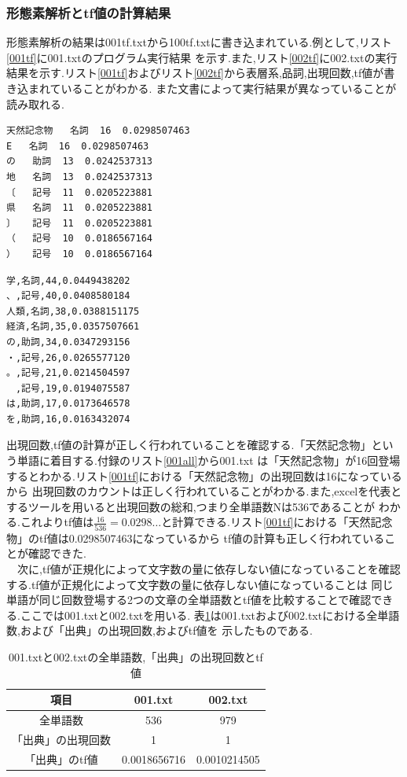 \documentclass[a4j]{jarticle}
\begin{document}
\subsubsection{形態素解析とtf値の計算結果}
形態素解析の結果は001tf.txtから100tf.txtに書き込まれている.例として,リスト\ref{001tf}に001.txtのプログラム実行結果
を示す.また,リスト\ref{002tf}に002.txtの実行結果を示す.リスト\ref{001tf}およびリスト\ref{002tf}から表層系,品詞,出現回数,tf値が書き込まれていることがわかる.
また文書によって実行結果が異なっていることが読み取れる.
\begin{lstlisting}[basicstyle=\ttfamily\footnotesize, frame=single,label=001tf,caption=001tf.txtの抜粋]
%	名詞	41	0.0764925373
天然記念物	名詞	16	0.0298507463
E	名詞	16	0.0298507463
の	助詞	13	0.0242537313
地	名詞	13	0.0242537313
〔	記号	11	0.0205223881
県	名詞	11	0.0205223881
〕	記号	11	0.0205223881
（	記号	10	0.0186567164
）	記号	10	0.0186567164
	\end{lstlisting}

\begin{lstlisting}[basicstyle=\ttfamily\footnotesize, frame=single,label=002tf,caption=002tf.txtの抜粋]
学,名詞,44,0.0449438202
、,記号,40,0.0408580184
人類,名詞,38,0.0388151175
経済,名詞,35,0.0357507661
の,助詞,34,0.0347293156
・,記号,26,0.0265577120
。,記号,21,0.0214504597
　,記号,19,0.0194075587
は,助詞,17,0.0173646578
を,助詞,16,0.0163432074
	\end{lstlisting}

出現回数,tf値の計算が正しく行われていることを確認する.「天然記念物」という単語に着目する.付録のリスト\ref{001all}から001.txt
は「天然記念物」が16回登場するとわかる.リスト\ref{001tf}における「天然記念物」の出現回数は16になっているから
出現回数のカウントは正しく行われていることがわかる.また,excelを代表とするツールを用いると出現回数の総和,つまり全単語数Nは536であることが
わかる.これよりtf値は$\frac{16}{536}=0.0298\dots$と計算できる.リスト\ref{001tf}における「天然記念物」のtf値は0.0298507463になっているから
tf値の計算も正しく行われていることが確認できた.\\
　次に,tf値が正規化によって文字数の量に依存しない値になっていることを確認する.tf値が正規化によって文字数の量に依存しない値になっていることは
同じ単語が同じ回数登場する2つの文章の全単語数とtf値を比較することで確認できる.ここでは001.txtと002.txtを用いる.
表\ref{tfh}は001.txtおよび002.txtにおける全単語数,および「出典」の出現回数,およびtf値を
示したものである.
\begin{table}[H]
	\caption{001.txtと002.txtの全単語数,「出典」の出現回数とtf値}
	\label{tfh}
	\begin{center}
		\begin{tabular}{c|c c}\hline
			項目 & 001.txt & 002.txt \\ \hline
			\hline
			全単語数 & 536 & 979 \\ 
			「出典」の出現回数 & 1 & 1 \\
			「出典」のtf値 & 0.0018656716 & 0.0010214505 \\ \hline
 		\end{tabular}
	\end{center}
	\end{table}
\end{document}
